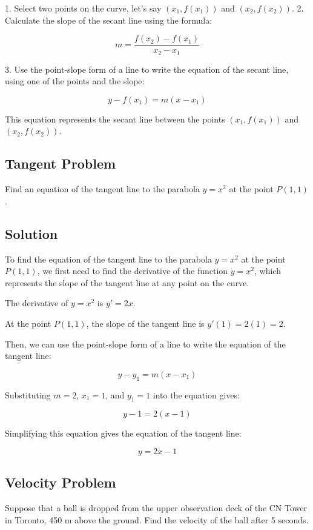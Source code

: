 \documentclass{article}
\begin{document}
1. Select two points on the curve, let's say $(x_1, f(x_1))$ and $(x_2, f(x_2))$.
2. Calculate the slope of the secant line using the formula:

\[ m = \frac{{f(x_2) - f(x_1)}}{{x_2 - x_1}} \]

3. Use the point-slope form of a line to write the equation of the secant line, using one of the points and the slope:

\[ y - f(x_1) = m(x - x_1) \]

This equation represents the secant line between the points $(x_1, f(x_1))$ and $(x_2, f(x_2))$.

\subsection{Tangent Problem}

Find an equation of the tangent line to the parabola $y = x^2$ at the point $P(1, 1)$.

\subsection{Solution}

To find the equation of the tangent line to the parabola $y = x^2$ at the point $P(1, 1)$, we first need to find the derivative of the function $y = x^2$, which represents the slope of the tangent line at any point on the curve.

The derivative of $y = x^2$ is $y' = 2x$. 

At the point $P(1, 1)$, the slope of the tangent line is $y'(1) = 2(1) = 2$.

Then, we can use the point-slope form of a line to write the equation of the tangent line:

\[ y - y_1 = m(x - x_1) \]

Substituting $m = 2$, $x_1 = 1$, and $y_1 = 1$ into the equation gives:

\[ y - 1 = 2(x - 1) \]

Simplifying this equation gives the equation of the tangent line:

\[ y = 2x - 1 \]

\subsection{Velocity Problem}

Suppose that a ball is dropped from the upper observation deck of the CN Tower in Toronto, 450 m above the ground. Find the velocity of the ball after 5 seconds.
\end{document}
